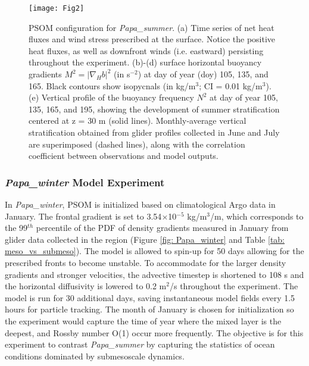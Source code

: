 \documentclass[article,linenumbers]{agujournal2019}
\begin{document}
	\begin{figure}[t]
		\texttt{[image: Fig2]}
		\caption{PSOM configuration for \textit{Papa\_summer}. (a) Time series of net heat fluxes and wind stress prescribed at the surface. Notice the positive heat fluxes, as well as downfront winds (i.e. eastward) persisting throughout the experiment. (b)-(d) surface horizontal buoyancy gradients $M^2 = |\nabla_Hb|^2$ (in s$^{-2}$) at day of year (doy) 105, 135, and 165. Black contours show isopycnals (in kg/m$^3$; CI = 0.01 kg/m$^3$). (e) Vertical profile of the buoyancy frequency $N^2$ at day of year 105, 135, 165, and 195, showing the development of summer stratification centered at z = 30 m (solid lines). Monthly-average vertical stratification obtained from glider profiles collected in June and July are superimposed (dashed lines), along with the correlation coefficient between observations and model outputs.}
		\label{fig: Papa_summer}
	\end{figure}


	\subsubsection{\textit{Papa\_winter} Model Experiment}

	In \textit{Papa\_winter}, PSOM is initialized based on climatological Argo data in January. The frontal gradient is set to 3.54$\times$10$^{-5}$ kg/m$^3$/m, which corresponds to the 99$^{th}$ percentile of the PDF of density gradients measured in January from glider data collected in the region (Figure \ref{fig: Papa_winter} and Table \ref{tab: meso_vs_submeso}). The model is allowed to spin-up for 50 days allowing for the prescribed fronts to become unstable. To accommodate for the larger density gradients and stronger velocities, the advective timestep is shortened to 108 s and the horizontal diffusivity is lowered to 0.2 m$^2$/s throughout the experiment. The model is run for 30 additional days, saving instantaneous model fields every 1.5 hours for particle tracking. The month of January is chosen for initialization so the experiment would capture the time of year where the mixed layer is the deepest, and Rossby number O(1) occur more frequently. The objective is for this experiment to contrast \textit{Papa\_summer} by capturing the statistics of ocean conditions dominated by submesoscale dynamics.
\end{document}
